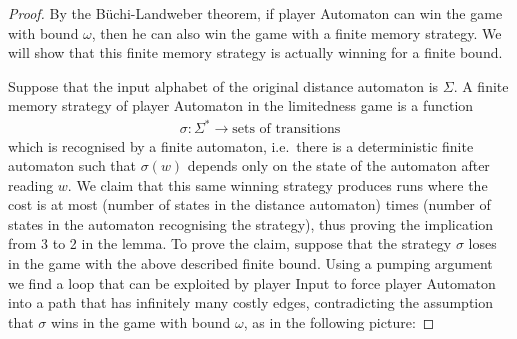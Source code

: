 \begin{proof}
By the Büchi-Landweber theorem, if player Automaton can win the game with bound $\omega$, then he can also win the game with a finite memory strategy. We will show that this finite memory strategy is actually winning for a finite bound.

Suppose that the input alphabet of the original distance automaton is $\Sigma$. A  finite memory strategy of player Automaton in the limitedness game  is a function
\begin{align*}
\sigma : \Sigma^* \to \text{sets of transitions} 	
\end{align*}
which is recognised by a finite automaton, i.e.~there is a deterministic finite automaton such that $\sigma(w)$ depends only on the state of the automaton after reading $w$. 
We claim that this same winning strategy produces runs where the cost is at most (number of states in the distance automaton) times (number of states in the automaton recognising the strategy), thus proving the implication from 3 to 2 in the lemma. To prove the claim, suppose that the strategy $\sigma$ loses in the game with the above described finite bound. Using a pumping argument we find a loop that can be exploited by player Input to force player Automaton into a path that has infinitely many costly edges, contradicting the assumption that $\sigma$ wins in the game with bound $\omega$,  as in the following picture:
\end{proof}









